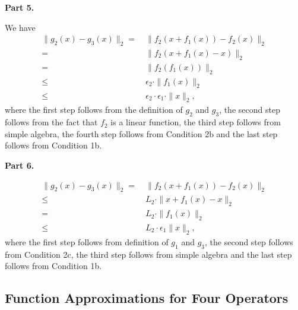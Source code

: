 {\bf Part 5.}

We have 
\begin{align*}
\| g_2 (x) - g_3(x) \|_2
= & ~ \| f_2(x+ f_1(x) ) - f_2(x) \|_2 \\
= & ~ \| f_2 (x+ f_1(x) - x) \|_2 \\
= & ~ \| f_2 (f_1(x) ) \|_2 \\
\leq & ~ \epsilon_2 \cdot \| f_1(x) \|_2 \\
\leq & ~ \epsilon_2 \cdot \epsilon_1 \cdot \| x \|_2,
\end{align*}
where the first step follows from the definition of $g_2$ and $g_3$, the second step follows from the fact that $f_2$ is a linear function, the third step follows from simple algebra, the fourth step follows from Condition 2b and the last step follows from Condition 1b.

{\bf Part 6.}

\begin{align*}
\| g_2 (x) - g_3(x) \|_2
= & ~ \| f_2(x+ f_1(x) ) - f_2(x) \|_2 \\
\leq & ~L_2 \cdot \| x+ f_1(x) - x \|_2  \\
= & ~  L_2 \cdot \| f_1 (x) \|_2 \\
\leq & ~ L_2 \cdot \epsilon_1 \| x \|_2,
\end{align*}
where the first step follows from definition of $g_1$ and $g_3$, the second step follows from Condition 2c, the third step follows from simple algebra and the last step follows from Condition 1b. 

\subsection{Function Approximations for Four Operators}\label{sec:fun_app_operators_app}


